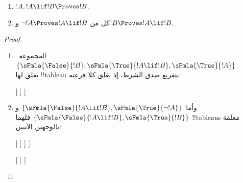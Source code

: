 \documentclass[../../../include/open-logic-section]{subfiles}
\begin{document}
\begin{prop}
  \begin{enumerate}
  \item {}  $!A, !A \lif !B \Proves !B$.
  \item {}
    كل من $\lnot !A \Proves !A \lif !B$ و$!B \Proves !A \lif !B$.
  \end{enumerate}
\end{prop}

\begin{proof}
  \begin{enumerate}
    \item المجموعة~$\{\sFmla{\False}{!B}, \sFmla{\True}{!A \lif !B},
      \sFmla{\True}{!A}\}$ يغلق لها !!{tableau}
      بتفريع صدق الشرط، إذ يغلق كلا فرعيه:
      \begin{oltableau}
        [\sFmla{\False}{\formula{B}}, just=\TAss
          [\sFmla{\True}{\formula{A} \lif \formula{B}}, just=\TAss
            [\sFmla{\True}{\formula{A}}, just=\TAss
              [\sFmla{\False}{\formula{A}}, just = {\TRule{\True}{\lif}[2]}, close]
              [\sFmla{\True}{\formula{B}}, just = {\TRule{\True}{\lif}[2]}, close]
            ]
          ]
        ]
      \end{oltableau}
    \item وأما~$\{\sFmla{\False}{!A \lif !B},
      \sFmla{\True}{\lnot !A}\}$ و$\{\sFmla{\False}{!A \lif !B},
      \sFmla{\True}{!B}\}$ فلهما !!{tableau}s مغلقة
      بالوجهين الآتيين:
      \begin{oltableau}
        [\sFmla{\False}{\formula{A} \lif \formula{B}}, just = \TAss
          [\sFmla{\True}{\lnot \formula{A}}, just = \TAss
            [\sFmla{\True}{\formula{A}}, just = {\TRule{\False}{\lif}[1]}
              [\sFmla{\False}{\formula{B}}, just = {\TRule{\False}{\lif}[1]}
                [\sFmla{\False}{\formula{A}}, just = {\TRule{\True}{\lnot}[2]}, close]
              ]
            ]
          ]
        ]
      \end{oltableau}
      \begin{oltableau}
        [\sFmla{\False}{\formula{A} \lif \formula{B}}, just = \TAss
          [\sFmla{\True}{\formula{B}}, just = \TAss
            [\sFmla{\True}{\formula{A}}, just = {\TRule{\False}{\lif}[1]}
              [\sFmla{\False}{\formula{B}}, just = {\TRule{\False}{\lif}[1]},close
              ]
            ]
          ]
        ]
      \end{oltableau}
  \end{enumerate}
\end{proof}
\end{document}
